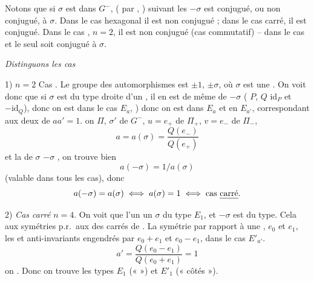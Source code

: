 \documentclass[11pt,a4paper]{article}
\begin{document}
 Notons que si $\sigma$ est dans $G^{-}$, 
( par \ill{} \ill{} , \ill{})
suivant les  $-\sigma$ est conjugué, ou non conjugué, à
$\sigma$. Dans le cas hexagonal il est non conjugué ; dans le cas carré, il
est conjugué. Dans le cas , $n = 2$, il est
 non conjugué (cas  
commutatif) -- dans le cas   et le seul \ill{}
\ill{} \struck{\ill{}} soit conjugué à $\sigma$. 

\emph{Distinguons les cas}

1) \emph{$n = 2$} Cas . Le groupe des automorphismes
 est $\pm 1$, $\pm \sigma$, où $\sigma$ est une .
On voit donc que si $\sigma$ est du type \ill{} \ill{} droite d'un
\ill{}, il en est de même de $-\sigma$ (\ill{} $P$, $Q$ \ill{}
$\mathrm{id}_{P}$ et $-\mathrm{id}_{Q}$), donc on est dans le cas $E_{a}$,
\ill{} \ill{}) donc on est dans $E_{a}$ et en $E_{a'}$, correspondant aux
deux \ill{} de \ill{} $a a' = 1$. \struck{\ill{}}  on
 $\Pi$, $\sigma'$ de $G^{-}$, \ill{} \ill{}
 $u = e_{+}$ de $\Pi_{+}$, \ill{} $v = e_{-}$ de
$\Pi_{-}$, \ill{}
\[
  a = a(\sigma) = \frac{Q(e_{-})}{Q(e_{+})}
\]
et  \ill{} la \ill{} de $\sigma$  $-\sigma$
\ill{} \ill{}, on trouve bien
\[
  a(-\sigma) = 1/a(\sigma)
\]
(valable dans tous les cas), donc
\[
  a(-\sigma) = a(\sigma) \iff a(\sigma) = 1 \iff \text{cas \emph{carré}} .
\]

2) \emph{Cas carré} $n = 4$. On voit que l'un  un $\sigma$ du type
$E_{1}$, et $-\sigma$ est du  type. Cela 
aux symétries p.r.\ aux  \struck{\ill{}} des carrés de
. La symétrie par rapport à une ,
 $e_{0}$ et $e_{1}$, les  et
anti-invariants  engendrés par $e_{0} + e_{1}$ et
$e_{0} - e_{1}$,  \ill{} \ill{} \ill{} dans le cas
$E'_{a'}$. 
\[
  a' = \frac{Q(e_{0} - e_{1})}{Q(e_{0} + e_{1})} = 1
\]
on  \ill{} \ill{}. Donc on trouve les types $E_{1}$
(«  ») et $E'_{1}$ (« côtés »).
\end{document}
